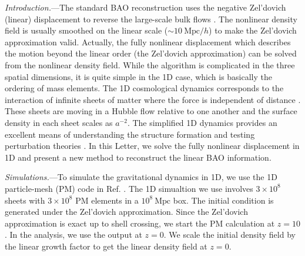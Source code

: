 \documentclass[aps,prd,twocolumn,showpacs,superscriptaddress,groupedaddress,nofootinbib]{revtex4}  %
\newcommand{\mr}{\mathrm}
\begin{document}

{\it Introduction.}---The standard BAO reconstruction uses the negative
Zel'dovich (linear) displacement to reverse the large-scale bulk flows 
\cite{2007bao}. 
The nonlinear density field is usually smoothed on the linear scale 
($\sim10\ \mr{Mpc}/h$) to make the Zel'dovich approximation valid.
Actually, the fully nonlinear displacement which describes the motion beyond
the linear order (the Zel'dovich approximation) can be solved from the nonlinear
density field.
While the algorithm is complicated in the three spatial dimensions, it is 
quite simple in the 1D case, which is basically the ordering of mass elements.
The 1D cosmological dynamics corresponds to the interaction of infinite sheets
of matter where the force is independent of distance \cite{2016matt}.
These sheets are moving in a Hubble flow relative to one another and the surface
density in each sheet scales as $a^{-2}$.
The simplified 1D dynamics provides an excellent means of understanding the 
structure formation and testing perturbation theories \cite{2016matt}.
In this Letter, we solve the fully nonlinear displacement in 1D and present
a new method to reconstruct the linear BAO information.


{\it Simulations.}---To simulate the gravitational dynamics in 1D, we use the 
1D particle-mesh (PM) code in Ref. \cite{2016matt}.
The 1D simualtion we use involves $3\times10^8$ sheets with $3\times10^8$ PM
elements in a $10^8\ \mr{Mpc}$ box.
The initial condition is generated under the Zel'dovich approximation.
Since the Zel'dovich approximation is exact up to shell crossing, we start 
the PM calculation at $z=10$. In the analysis, we use the output at $z=0$.
We scale the initial density field by the linear growth factor to get the
linear density field at $z=0$.
\end{document}
